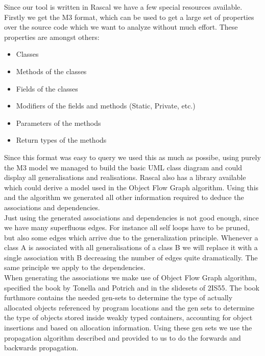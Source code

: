 \documentclass[a4paper,twoside,11pt]{article}
\begin{document}
Since our tool is written in Rascal we have a few special resources available. Firstly we get the M3 format, which can be used to get a large set of properties over the source code which we want to analyze without much effort. These properties are amongst others:

\begin{itemize}
\item Classes
\item Methods of the classes
\item Fields of the classes
\item Modifiers of the fields and methods (Static, Private, etc.)
\item Parameters of the methods
\item Return types of the methods
\end{itemize}

Since this format was easy to query we used this as much as possibe, using purely the M3 model we managed to build the basic UML class diagram and could display all generalisations and realisations. Rascal also has a library available which could derive a model used in the Object Flow Graph algorithm. Using this and the algorithm we generated all other information required to deduce the associations and dependencies. \\

Just using the generated associations and dependencies is not good enough, since we have many superfluous edges. For instance all self loops have to be pruned, but also some edges which arrive due to the generalization principle. Whenever a class {\sc A} is associated with all generalisations of a class {\sc B} we will replace it with a single association with {\sc B} decreasing the number of edges quite dramatically. The same principle we apply to the dependencies. \\

When generating the associations we make use of Object Flow Graph algorithm, specified the book by Tonella and Potrich\cite{book:book} and in the slidesets of 2IS55\cite{url:slideset}. The book furthmore contains the needed gen-sets to determine the type of actually allocated objects referenced by program locations and the gen sets to determine the type of objects stored inside weakly typed containers, accounting for object insertions and based on allocation information. Using these gen sets we use the propagation algorithm described and provided\cite{url:jurgen} to us to do the forwards and backwards propagation. \\
\end{document}
